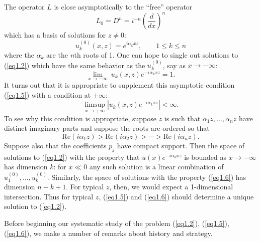 \documentclass{surv-l}
\theoremstyle{plain}
\theoremstyle{definition}
\numberwithin{equation}{chapter}
\begin{document}
The operator $L$ is close asymptotically to the ``free'' operator
\begin{equation}\label{eq1.3}
L_{0}=D^{n}=i^{-n}\left(\frac{d}{dx}\right)^{n}
\end{equation}
which has a basis of solutions for $z\neq 0$:
\begin{equation}\label{eq1.4}
u_{k}^{(0)}(x,z)=e^{i\alpha_{k}xz},\qquad 1\leq k\leq n
\end{equation}
where the $\alpha_{k}$ are the \emph{n}th roots of 1. One can hope to single out solutions to (\ref{eq1.2}) which have the same behavior as the $u_{k}^{(0)}$, say as $x\rightarrow-\infty$:
\begin{equation}\label{eq1.5}
\lim_{x\rightarrow-\infty}\ u_{k}(x, z)e^{-i\alpha_{k}xz}=1.
\end{equation}
It turns out that it is appropriate to supplement this asymptotic condition (\ref{eq1.5}) with a condition at $+\infty$:
\begin{equation}\label{eq1.6}
\mathop{\lim\sup}_{x\rightarrow+\infty}|u_{k}(x,z)e^{-i\alpha_{k}xz}|<\infty.
\end{equation}
To see why this condition is appropriate, suppose $z$ is such that $\alpha_{1}z,\ldots, \alpha_{n}z$ have distinct imaginary parts and suppose the roots are ordered so that
\begin{equation}\label{eq1.7}
\mathrm{Re}(i\alpha_{1}z)>\mathrm{Re}(i\alpha_{2}z)>\cdots >\mathrm{Re}(i\alpha_{n}z).
\end{equation}
Suppose also that the coefficients $p_{j}$ have compact support. Then the space of solutions to (\ref{eq1.2}) with the property that $u(x)e^{-i\alpha_{k}xz}$ is bounded as $ x\rightarrow-\infty$ has dimension $k$: for $x\ll 0$ any such solution is a linear combination of $u_{1}^{(0)}, \ldots, u_{k}^{(0)}$. Similarly, the space of solutions with the property (\ref{eq1.6}) has dimension $n-k+1$. For typical $z$, then, we would expect a 1-dimensional intersection. Thus for typical $z$, (\ref{eq1.5}) and (\ref{eq1.6}) should determine a unique solution to (\ref{eq1.2}).

Before beginning our systematic study of the problem (\ref{eq1.2}), (\ref{eq1.5}), (\ref{eq1.6}), we make a number of remarks about history and strategy.
\end{document}
